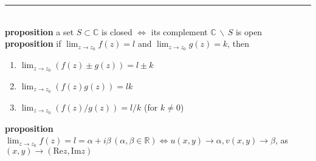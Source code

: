 \documentclass[a4paper]{article}
\newcommand*\setremove[2]{#1 \, \backslash \, #2}
\newcommand*\linesep[0]{\noindent\rule{\textwidth}{0.5pt}\\}
\begin{document}
\begin{framed}
	\linesep
	
	\noindent
	\textbf{proposition} a set $S \subset \mathbb{C}$ is closed $\iff$ its complement $\setremove{\mathbb{C}}{S}$ is open\\
	
	\noindent
	\textbf{proposition} if $\lim_{z \rightarrow z_0} f(z) = l$ and $\lim_{z \rightarrow z_0} g(z) = k$, then
	\begin{enumerate}
		\item $\lim_{z \rightarrow z_0} (f(z) \pm g(z)) = l \pm k$
		\item $\lim_{z \rightarrow z_0} (f(z)g(z)) = lk$
		\item $\lim_{z \rightarrow z_0} (f(z)/g(z)) = l/k$ (for $k \neq 0$)
	\end{enumerate}
	
	\noindent
	\textbf{proposition} $\lim_{z \rightarrow z_0} f(z) = l = \alpha + i\beta \, (\alpha, \beta \in \mathbb{R}) \iff u(x, y) \rightarrow \alpha, v(x, y) \rightarrow \beta$, as $(x, y) \rightarrow (\text{Re}z, \text{Im}z)$
\end{framed}
\end{document}
